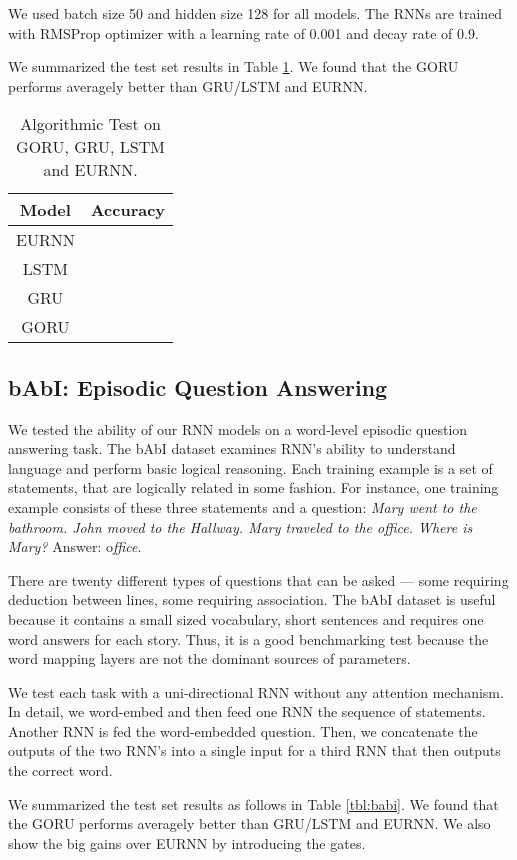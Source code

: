 \documentclass[letterpaper]{article} \usepackage{aaai18}  \usepackage{times}  \usepackage{helvet}  \usepackage{courier}  \usepackage{url}  \usepackage{graphicx}
\begin{document}
We used batch size 50 and hidden size 128 for all models. The RNNs are trained with RMSProp optimizer with a learning rate of 0.001 and decay rate of 0.9.

We summarized the test set results in Table \ref{tbl:algo_tasks}. We found that the GORU performs averagely better than GRU/LSTM and EURNN. 


\begin{table}[h!]
\centering
\begin{tabular}{cc}
\hline
Model & Accuracy \\
\hline
EURNN &  \\
LSTM &  \\
GRU &  \\
GORU &  \\
\hline
\end{tabular}
\caption{Algorithmic Test on GORU, GRU, LSTM and EURNN.}
\label{tbl:algo_tasks}
\end{table}

\subsection{bAbI: Episodic Question Answering}
We tested the ability of our RNN models on a word-level episodic question answering task. The bAbI dataset \cite{weston2015towards} examines RNN's ability to understand language and perform basic logical reasoning. Each training example is a set of statements, that are logically related in some fashion. For instance, one training example consists of these three statements and a question: {\it Mary went to the bathroom. John moved to the Hallway. Mary traveled to the office. Where is Mary?} Answer: o{\it ffice}.

There are twenty different types of questions that can be asked --- some requiring deduction between lines, some requiring association. The bAbI dataset is useful because it contains a small sized vocabulary, short sentences and requires one word answers for each story. Thus, it is a good benchmarking test because the word mapping layers are not the dominant sources of parameters.  

We test each task with a uni-directional RNN without any attention mechanism. In detail, we word-embed and then feed one RNN the sequence of statements. Another RNN is fed the word-embedded question. Then, we concatenate the outputs of the two RNN's into a single input for a third RNN that then outputs the correct word. 

We summarized the test set results as follows in Table \ref{tbl:babi}. We found that the GORU performs averagely better than GRU/LSTM and EURNN. We also show the big gains over EURNN by introducing the gates.
\end{document}

